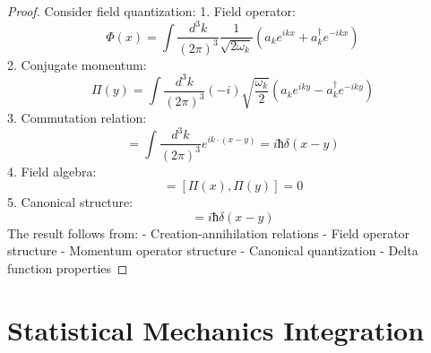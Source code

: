 \documentclass[12pt]{article}
\begin{document}
\begin{proof}
Consider field quantization:
1. Field operator:
\begin{equation}
\Phi(x) = \int\frac{d^3k}{(2\pi)^3}\frac{1}{\sqrt{2\omega_k}}(a_ke^{ikx} + a_k^\dagger e^{-ikx})
\end{equation}
2. Conjugate momentum:
\begin{equation}
\Pi(y) = \int\frac{d^3k}{(2\pi)^3}(-i)\sqrt{\frac{\omega_k}{2}}(a_ke^{iky} - a_k^\dagger e^{-iky})
\end{equation}
3. Commutation relation:
\begin{equation}
[\Phi(x),\Pi(y)] = \int\frac{d^3k}{(2\pi)^3}e^{ik\cdot(x-y)} = iħ\delta(x-y)
\end{equation}
4. Field algebra:
\begin{equation}
[\Phi(x),\Phi(y)] = [\Pi(x),\Pi(y)] = 0
\end{equation}
5. Canonical structure:
\begin{equation}
[\Phi(x),\Pi(y)] = iħ\delta(x-y)
\end{equation}
The result follows from:
- Creation-annihilation relations
- Field operator structure
- Momentum operator structure
- Canonical quantization
- Delta function properties
\end{proof}
\section{Statistical Mechanics Integration}
\end{document}

